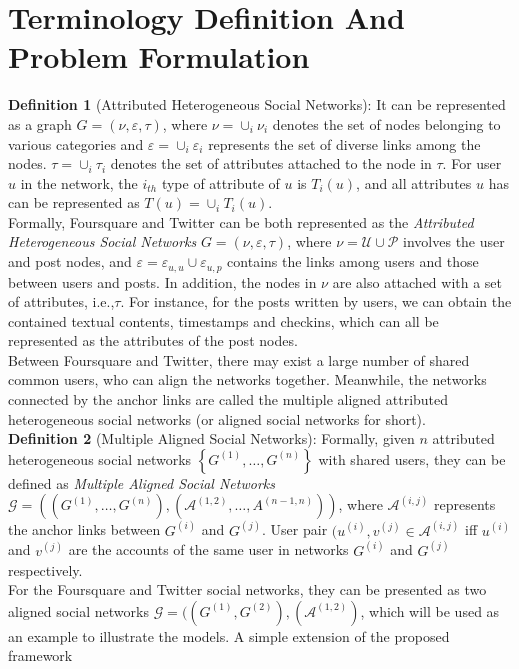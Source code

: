 \documentclass{article}
\begin{document}
\section{Terminology Definition And Problem Formulation}
\noindent \textbf{Definition 1} (Attributed Heterogeneous Social Networks): It can be represented as a graph $G = (\nu, \varepsilon, \tau)$, where $\nu = \cup_{i}\nu_{i}$ denotes the set of nodes belonging to various categories and $\varepsilon = \cup_{i}\varepsilon_{i}$ represents the set of diverse links among the nodes. $\tau = \cup_{i}\tau_{i}$ denotes the set of attributes attached to the node in $\tau$. For user $u$ in the network, the $i_{th}$ type of attribute of $u$ is $T_{i}(u)$, and all attributes $u$ has can be represented as $T(u) = \cup_{i}T_{i}(u)$.\\
\indent Formally, Foursquare and Twitter can be both represented as the \emph{Attributed Heterogeneous Social Networks} $G = (\nu, \varepsilon, \tau)$, where $\nu = \mathcal{U} \cup \mathcal{P}$ involves the user and post nodes, and $\varepsilon = \varepsilon_{u,u} \cup \varepsilon_{u,p}$  contains  the links among users and those between users and posts. In addition, the nodes in $\nu$  are also attached with a set
of attributes, i.e.,$\tau$. For instance, for the posts written by users, we can obtain the contained textual contents, timestamps and checkins,
which can all be represented as the attributes of the post nodes.\\
\indent Between Foursquare and Twitter, there may exist a large number
of shared common users, who can align the networks together. Meanwhile, the networks connected by the anchor links are
called the multiple aligned attributed heterogeneous social networks
(or aligned social networks for short).\\
\textbf{Definition 2} (Multiple Aligned Social Networks): Formally, given $n$ attributed heterogeneous social networks $\left\{ G^{(1)}, \dots, G^{(n)} \right\}$ with shared users, they can be defined as \emph{Multiple Aligned Social Networks} $\mathcal{G}=((G^{(1)}, \dots, G^{(n)}), (\mathcal{A}^{(1,2)}, \dots, A^{(n-1,n)}))$, where $\mathcal{A}^{(i,j)}$ represents the anchor links between $G^{(i)}$ and $G^{(j)}$. User pair $(u^{(i)},v^{(j)}\in \mathcal{A}^{(i,j)}$ iff $u^{(i)}$ and $v^{(j)}$ are the accounts of the same user in networks $G^{(i)}$ and $G^{(j)}$ respectively.\\
\indent For the Foursquare and Twitter social networks, they can be presented as two aligned social networks $\mathcal{G}=((G^{(1)}, G^{(2)}), (\mathcal{A}^{(1,2)})$, which will be used as an example to illustrate the models. A simple extension of the proposed framework
\end{document}
